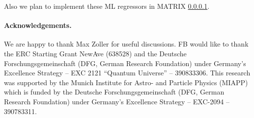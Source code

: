 \documentclass[aps,prl,twocolumn,superscriptaddress,amsfont,graphicx,preprintnumbers]{revtex4-1}
\newcommand{\red}[1]{{\color{Red}{#1}}}
\newcommand{\MAkl}[2]{\mathcal{M}^{[A_#1]}_{#2}}
\newcommand{\MBkl}[2]{\mathcal{M}^{[B_#1]}_{#2}}
\begin{document}
Also we plan to implement these ML regressors in MATRIX \ref{}.

\medskip

\begin{acknowledgments} 
\paragraph{\bf Acknowledgements.} We are happy to thank Max Zoller for useful discussions. FB would like to thank the ERC Starting Grant NewAve (638528) and the Deutsche Forschungsgemeinschaft (DFG, German Research Foundation) under Germany's Excellence Strategy – EXC 2121 ``Quantum Universe'' -- 390833306. This research was supported by the Munich Institute for Astro- and Particle Physics (MIAPP) which is funded by the Deutsche Forschungsgemeinschaft (DFG, German Research Foundation) under Germany's Excellence Strategy -- EXC-2094 – 390783311.
\end{acknowledgments}
%








\end{document}
